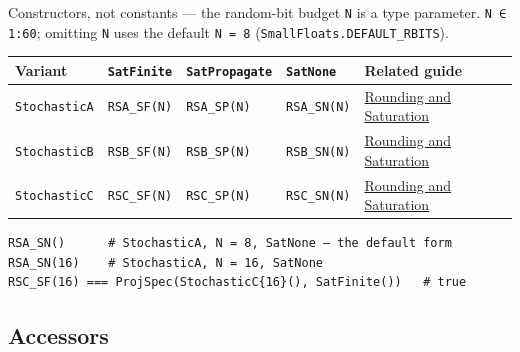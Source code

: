 Constructors, not constants — the random-bit budget \texttt{N} is a type parameter. \texttt{N ∈ 1:60}; omitting \texttt{N} uses the default \texttt{N = 8} (\texttt{SmallFloats.DEFAULT\_\allowbreak{}RBITS}).




\begin{table}[h]
\centering
\begin{tabulary}{\linewidth}{L L L L L}
\toprule
Variant & \texttt{SatFinite} & \texttt{SatPropagate} & \texttt{SatNone} & Related guide \\
\toprule
\texttt{StochasticA} & \texttt{RSA\_\allowbreak{}SF(N)} & \texttt{RSA\_\allowbreak{}SP(N)} & \texttt{RSA\_\allowbreak{}SN(N)} & \href{concept\_\allowbreak{}rounding\_\allowbreak{}saturation.md}{Rounding and Saturation} \\
\texttt{StochasticB} & \texttt{RSB\_\allowbreak{}SF(N)} & \texttt{RSB\_\allowbreak{}SP(N)} & \texttt{RSB\_\allowbreak{}SN(N)} & \href{concept\_\allowbreak{}rounding\_\allowbreak{}saturation.md}{Rounding and Saturation} \\
\texttt{StochasticC} & \texttt{RSC\_\allowbreak{}SF(N)} & \texttt{RSC\_\allowbreak{}SP(N)} & \texttt{RSC\_\allowbreak{}SN(N)} & \href{concept\_\allowbreak{}rounding\_\allowbreak{}saturation.md}{Rounding and Saturation} \\
\bottomrule
\end{tabulary}

\end{table}




\begin{verbatim}
RSA_SN()      # StochasticA, N = 8, SatNone — the default form
RSA_SN(16)    # StochasticA, N = 16, SatNone
RSC_SF(16) === ProjSpec(StochasticC{16}(), SatFinite())   # true
\end{verbatim}



\subsection{Accessors}



\label{11927386850142820610}{}




